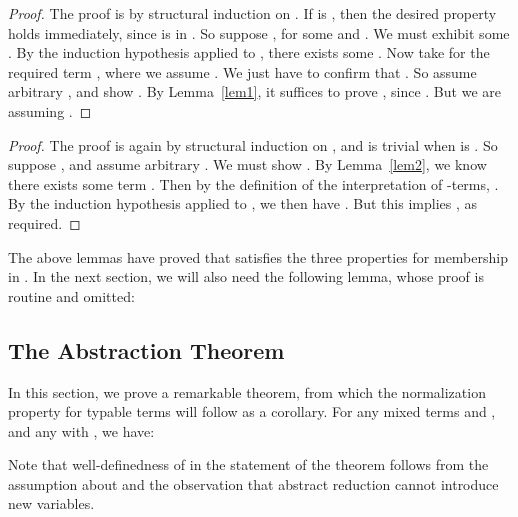 \documentclass{LMCS}
\begin{document}
\begin{lem}
\label{lem2}

\end{lem}

\begin{proof} The proof is by structural induction on .  If  is , then the
desired property holds immediately, since  is in
.  So suppose , for some 
and .  We must exhibit some .  By
the induction hypothesis applied to , there exists some
.  Now take  for the
required term , where we assume .  We just have to confirm that .  So assume arbitrary
, and show .  By Lemma~\ref{lem1}, it suffices
to prove , since .  But we are assuming
.
\end{proof}

\begin{lem}
\label{lem3}

\end{lem}

\begin{proof} The proof is again by structural induction on , and is trivial when
 is .  So suppose , and assume arbitrary
.  We must show .
By Lemma~\ref{lem2}, we know there exists some term
.  Then by the definition of the
interpretation of -terms, .  By the
induction hypothesis applied to , we then have
.  But this implies , as
required.
\end{proof}

\begin{cor}

\end{cor}

\noindent The above lemmas have proved that 
satisfies the three properties for membership in .  In
the next section, we will also need the following lemma, whose proof
is routine and omitted:

\begin{lem}
\label{lem:semsubst}

\end{lem}

\subsection{The Abstraction Theorem}
\label{sec:abstr}

In this section, we prove a remarkable theorem, from which the
normalization property for typable terms will follow as a corollary.
For any mixed terms  and , and any  with
, we have:

\begin{thm}
\label{thm:abstr}

\end{thm}
\noindent Note that well-definedness of  in the
statement of the theorem follows from the assumption about  and
the observation that abstract reduction cannot introduce new
variables.
\end{document}
